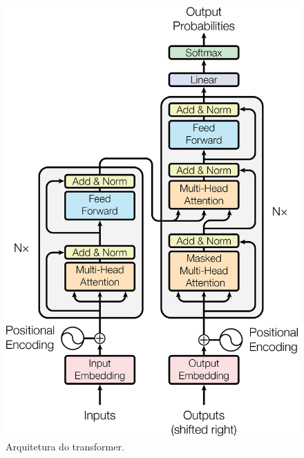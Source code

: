 
\begin{figure}
  \begin{minipage}[b]{0.6\textwidth}
    \includegraphics[scale=0.5]{images/ModalNet-21}
    \caption{Arquitetura do transformer.}
    \label{fig:transformer-arch}
  \end{minipage}
  \begin{minipage}[b]{0.5\textwidth}

\end{minipage}
\end{figure}
